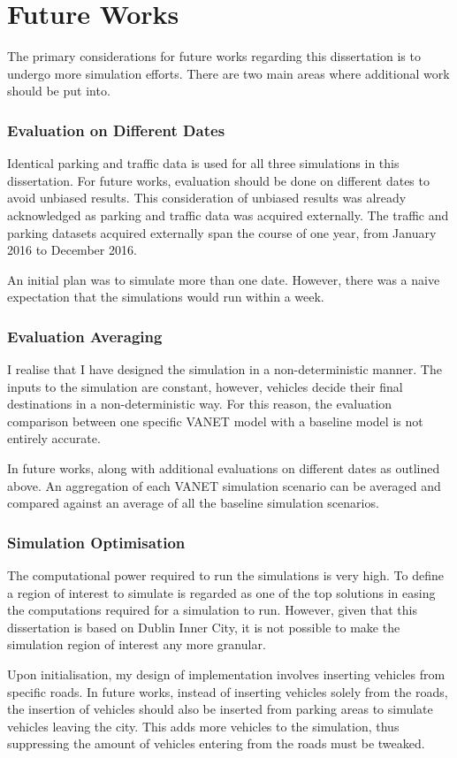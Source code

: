 \section{Future Works}
The primary considerations for future works regarding this dissertation is to undergo more simulation efforts. There are two main areas where  additional work should be put into.

\subsubsection*{Evaluation on Different Dates}
Identical parking and traffic data is used for all three simulations in this dissertation. For future works, evaluation should be done on different dates to avoid unbiased results. This consideration of unbiased results was already acknowledged as parking and traffic data was acquired externally. The traffic and parking datasets acquired externally span the course of one year, from January 2016 to December 2016.

An initial plan was to simulate more than one date. However, there was a naive expectation that the simulations would run within a week.

\subsubsection*{Evaluation Averaging}
I realise that I have designed the simulation in a non-deterministic manner. The inputs to the simulation are constant, however, vehicles decide their final destinations in a non-deterministic way. For this reason, the evaluation comparison between one specific \ac{VANET} model with a baseline model is not entirely accurate.

In future works, along with additional evaluations on different dates as outlined above. An aggregation of each \ac{VANET} simulation scenario can be averaged and compared against an average of all the baseline simulation scenarios.

\subsubsection*{Simulation Optimisation}
The computational power required to run the simulations is very high. To define a region of interest to simulate is regarded as one of the top solutions in easing the computations required for a simulation to run. However, given that this dissertation is based on Dublin Inner City, it is not possible to make the simulation region of interest any more granular.

Upon initialisation, my design of implementation involves inserting vehicles from specific roads. In future works, instead of inserting vehicles solely from the roads, the insertion of vehicles should also be inserted from parking areas to simulate vehicles leaving the city. This adds more vehicles to the simulation, thus suppressing the amount of vehicles entering from the roads must be tweaked.